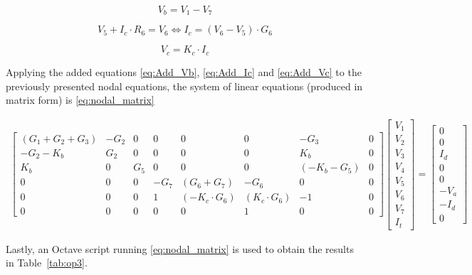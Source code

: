 \begin{equation}
    V_b = V_1 - V_7
    \label{eq:Add_Vb}
\end{equation}

\begin{equation}
    V_5 + I_c \cdot R_6 = V_6 \Leftrightarrow I_c = (V_6 - V_5) \cdot G_6
    \label{eq:Add_Ic}
\end{equation}

\begin{equation}
    V_c = K_c \cdot I_c
    \label{eq:Add_Vc}
\end{equation}


Applying the added equations \ref{eq:Add_Vb}, \ref{eq:Add_Ic} and \ref{eq:Add_Vc} to the previously presented nodal 
equations, the system of linear equations (produced in matrix form) is \ref{eq:nodal_matrix}

\begin{gather}
  \begin{bmatrix} 
    (G_1 + G_2 + G_3) & -G_2 & 0 & 0 & 0 & 0 & -G_3 & 0 \\ -G_2 - K_b & G_2 & 0 & 0 & 0 & 0 & K_b & 0 \\ K_b & 0 & G_5 & 0 & 0 & 0 & (-K_b-G_5) & 0 \\ 0 & 0 & 0 & -G_7 & (G_6+G_7) & -G_6 & 0 & 0 \\ 0 & 0 & 0 & 1 & (-K_c \cdot G_6) & (K_c \cdot G_6) & -1 & 0 \\ 0 & 0 & 0 & 0 & 0 & 1 & 0 & 0 
  \end{bmatrix}
  \begin{bmatrix}
    V_1 \\ V_2 \\ V_3 \\ V_4 \\ V_5 \\ V_6 \\ V_7 \\ I_t
  \end{bmatrix}
  =
  \begin{bmatrix}
    0 \\ 0 \\ I_d \\ 0 \\ 0 \\ -V_a \\ -I_d \\ 0
  \end{bmatrix}
  \label{eq:nodal_matrix}
\end{gather}


Lastly, an Octave script running \ref{eq:nodal_matrix} is used to obtain the results in Table~\ref{tab:op3}.


